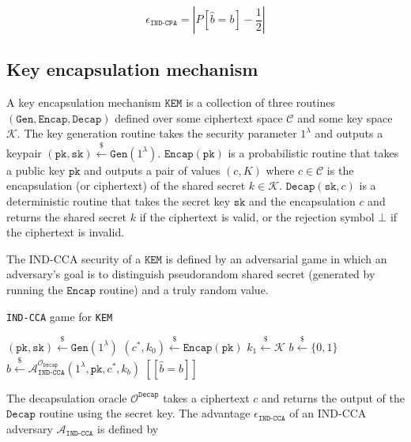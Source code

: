 \documentclass[floatrow,journal=tches,submission]{iacrtrans}
\newcommand{\monospace}{\texttt}
\newcommand{\keygen}{\monospace{Gen}}
\newcommand{\kem}{\monospace{KEM}}
\newcommand{\encap}{\monospace{Encap}}
\newcommand{\decap}{\monospace{Decap}}
\newcommand{\pk}{\monospace{pk}}
\newcommand{\sk}{\monospace{sk}}
\newcommand{\leftsample}{\stackrel{\$}{\leftarrow}}
\newcommand{\llbrack}{[\![}
\newcommand{\rrbrack}{]\!]}
\newcommand{\norm}[1]{\left\lvert #1 \right\rvert}
\begin{document}
\begin{equation*}
    \epsilon_\monospace{IND-CPA} = \norm{
        P[\hat{b} = b] - \frac{1}{2}
    }
\end{equation*}

\subsection{Key encapsulation mechanism}
A key encapsulation mechanism $\kem$ is a collection of three routines $(\keygen, \encap, \decap)$ defined over some ciphertext space $\mathcal{C}$ and some key space $\mathcal{K}$. The key generation routine takes the security parameter $1^\lambda$ and outputs a keypair $(\pk, \sk) \leftsample \keygen(1^\lambda)$. $\encap(\pk)$ is a probabilistic routine that takes a public key $\pk$ and outputs a pair of values $(c, K)$ where $c \in \mathcal{C}$ is the encapsulation (or ciphertext) of the shared secret $k \in \mathcal{K}$. $\decap(\sk, c)$ is a deterministic routine that takes the secret key $\sk$ and the encapsulation $c$ and returns the shared secret $k$ if the ciphertext is valid, or the rejection symbol $\bot$ if the ciphertext is invalid.

The IND-CCA security of a $\kem$ is defined by an adversarial game in which an adversary's goal is to distinguish pseudorandom shared secret (generated by running the $\encap$ routine) and a truly random value.

\begin{algorithm}
    \caption{
        \monospace{IND-CCA} game for \kem
    }\label{alg:kem-ind-cca-game}
    
    \begin{algorithmic}[1]
        \State $(\pk, \sk) \leftsample \keygen(1^\lambda)$
        \State $(c^\ast, k_0) \leftsample \encap(\pk)$
        \State $k_1 \leftsample \mathcal{K}$
        \State $b \leftsample \{0, 1\}$
        \State $\hat{b} \leftsample \mathcal{A}_\monospace{IND-CCA}^{\mathcal{O}_\decap}(
            1^\lambda, \pk, c^\ast, k_b
        )$
        \State \Return $\llbrack \hat{b} = b \rrbrack$
    \end{algorithmic}
\end{algorithm}

The decapsulation oracle $\mathcal{O}^\decap$ takes a ciphertext $c$ and returns the output of the $\decap$ routine using the secret key. The advantage $\epsilon_\monospace{IND-CCA}$ of an IND-CCA adversary $\mathcal{A}_\monospace{IND-CCA}$ is defined by
\end{document}
